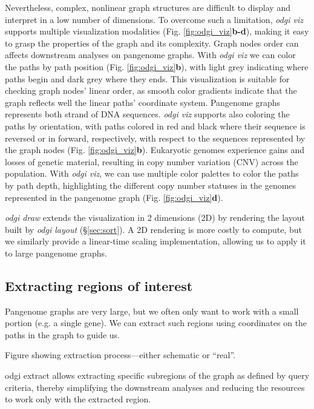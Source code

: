 \documentclass{bioinfo}
\begin{document}
Nevertheless, complex, nonlinear graph structures are difficult to display and interpret in a low number of dimensions.
To overcome such a limitation, \textit{odgi viz} supports multiple visualization modalities (Fig. \ref{fig:odgi_viz}\textbf{b-d}), making it easy to grasp the properties of the graph and its complexity.
Graph nodes order can affects downstream analyses on pangenome graphs. With \textit{odgi viz} we can color the paths by path position (Fig. \ref{fig:odgi_viz}\textbf{b}), with light grey indicating where paths begin and dark grey where they ends.
This visualization is suitable for checking graph nodes' linear order, as smooth color gradients indicate that the graph reflects well the linear paths' coordinate system.
Pangenome graphs represents both strand of DNA sequences.
\textit{odgi viz} supports also coloring the paths by orientation, with paths colored in red and black where their sequence is reversed or in forward, respectively, with respect to the sequences represented by the graph nodes (Fig. \ref{fig:odgi_viz}\textbf{b}).
Eukaryotic genomes experience gains and losses of genetic material, resulting in copy number variation (CNV) across the population.
With \textit{odgi viz}, we can use multiple color palettes to color the paths by path depth, highlighting the different copy number statuses in the genomes represented in the pangenome graph (Fig. \ref{fig:odgi_viz}\textbf{d}).


\textit{odgi draw} extends the visualization in 2 dimensions (2D) by rendering the layout built by \textit{odgi layout} (\S\ref{sec:sort}). A 2D rendering is more costly to compute, but we similarly provide a linear-time scaling implementation, allowing us to apply it to large pangenome graphs.


\subsection{Extracting regions of interest}
\label{sec:extract}


Pangenome graphs are very large, but we often only want to work with a small portion (e.g. a single gene).
We can extract such regions using coordinates on the paths in the graph to guide us.

Figure showing extraction process---either schematic or ``real''.

odgi extract allows extracting specific subregions of the graph as defined by query criteria, thereby simplifying the downstream analyses and reducing the resources to work only with the extracted region.
\end{document}

